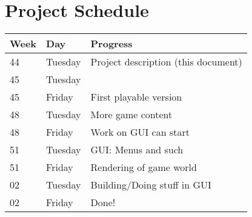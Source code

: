 \documentclass[a4paper]{article}
\begin{document}
\section{Project Schedule}

\begin{table}[H]
\centering
\begin{tabular}{lll}
\toprule
Week & Day & Progress\\
\toprule
44 & Tuesday & Project description (this document)\\
\midrule
45 & Tuesday & \\
45 & Friday &  First playable version\\
\midrule
48 & Tuesday & More game content\\
48 & Friday & Work on GUI can start\\
\midrule
51 & Tuesday &  GUI: Menus and such\\
51 & Friday &  Rendering of game world\\
\midrule
02 & Tuesday &  Building/Doing stuff in GUI\\
02 & Friday &  Done!\\
\bottomrule
\end{tabular}
\end{table}
\end{document}
